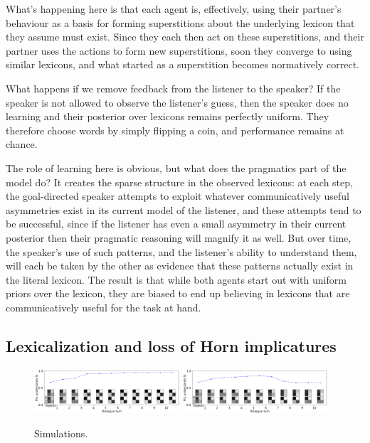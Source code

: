 \documentclass{article} %
\begin{document}
What's happening here is that each agent is, effectively, using their partner's behaviour as a basis for forming superstitions about the underlying lexicon that they assume must exist. Since they each then act on these superstitions, and their partner uses the actions to form new superstitions, soon they converge to using similar lexicons, and what started as a superstition becomes normatively correct.

What happens if we remove feedback from the listener to the speaker? If the speaker is not allowed to observe the listener's guess, then the speaker does no learning and their posterior over lexicons remains perfectly uniform. They therefore choose words by simply flipping a coin, and performance remains at chance.

The role of learning here is obvious, but what does the pragmatics part of the model do? It creates the sparse structure in the observed lexicons: at each step, the goal-directed speaker attempts to exploit whatever communicatively useful asymmetries exist in its current model of the listener, and these attempts tend to be successful, since if the listener has even a small asymmetry in their current posterior then their pragmatic reasoning will magnify it as well. But over time, the speaker's use of such patterns, and the listener's ability to understand them, will each be taken by the other as evidence that these patterns actually exist in the literal lexicon. The result is that while both agents start out with uniform priors over the lexicon, they are biased to end up believing in lexicons that are communicatively useful for the task at hand.


\subsection{Lexicalization and loss of Horn implicatures}
\label{sec:horn-emergence}

\begin{figure}[t]
\centering
\includegraphics[width=0.48\textwidth]{figures/horn-emergence-0.pdf}
\includegraphics[width=0.48\textwidth]{figures/horn-emergence-1.pdf}
\caption{\label{fig:horn} Simulations.}
\end{figure}
\end{document}
